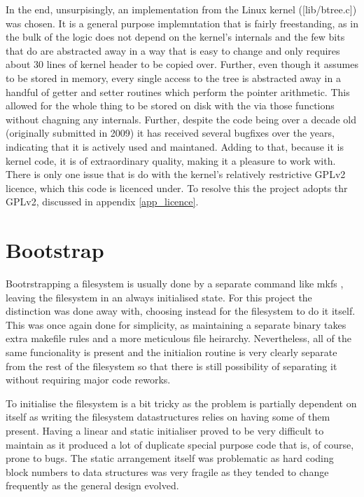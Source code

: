        In the end, unsurpisingly, an implementation from the Linux kernel
        (\cite{Linux_source}[lib/btree.c]) was chosen. It is a general purpose
        \bplustree implemntation that is fairly freestanding, as in the bulk of
        the logic does not depend on the kernel's internals and the few bits
        that do are abstracted away in a way that is easy to change and only
        requires about 30 lines of kernel header to be copied over. Further,
        even though it assumes to be stored in memory, every single access to
        the tree is abstracted away in a handful of getter and setter routines
        which perform the pointer arithmetic. This allowed for the whole thing
        to be stored on disk with the via those functions without chagning any
        internals. Further, despite the code being over a decade old
        (originally submitted in 2009) it has received several bugfixes over
        the years, indicating that it is actively used and maintaned. Adding to
        that, because it is kernel code, it is of extraordinary quality, making
        it a pleasure to work with. There is only one issue that is do with the
        kernel's relatively restrictive GPLv2 licence, which this code is
        licenced under. To resolve this the project adopts thr GPLv2, discussed
        in appendix \ref{app_licence}.

    \section{Bootstrap}

        Bootrstrapping a filesystem is usually done by a separate command like
        mkfs \cite{man_mkfs}, leaving the filesystem in an always initialised
        state. For this project the distinction was done away with, choosing
        instead for the filesystem to do it itself. This was once again done
        for simplicity, as maintaining a separate binary takes extra makefile
        rules and a more meticulous file heirarchy. Nevertheless, all of the
        same funcionality is present and the initialion routine is very clearly
        separate from the rest of the filesystem so that there is still
        possibility of separating it without requiring major code reworks.

        To initialise the filesystem is a bit tricky as the problem is
        partially dependent on itself as writing the filesystem datastructures
        relies on having some of them present. Having a linear and static
        initialiser proved to be very difficult to maintain as it produced a
        lot of duplicate special purpose code that is, of course, prone to
        bugs. The static arrangement itself was problematic as hard coding
        block numbers to data structures was very fragile as they tended to
        change frequently as the general design evolved.

